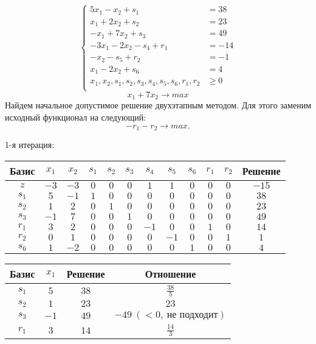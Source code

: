 \documentclass{article}%
\begin{document}
\[%
\left\{\begin{aligned}5x_{1}-x_{2}+s_{1} & =38 \\x_{1}+2x_{2}+s_{2} & =23 \\-x_{1}+7x_{2}+s_{3} & =49 \\-3x_{1}-2x_{2}-s_{4}+r_{1} & =-14 \\-x_{2}-s_{5}+r_{2} & =-1 \\x_{1}-2x_{2}+s_{6} & =4 \\x_{1},x_{2},s_{1},s_{2},s_{3},s_{4},s_{5},s_{6},r_{1},r_{2} & \ge 0 \\ \end{aligned}\right.%
\]%
\[%
x_{1}+7x_{2}  \to max%
\]%
Найдем начальное допустимое решение двухэтапным методом. Для этого заменим исходный функционал на следующий: %
\[%
-r_{1}-r_{2}\to max.%
\]%
\begin{flushleft}%
1{-}я итерация: %
\newline%
\newline%
\renewcommand{\arraystretch}{1.3}%
\begin{tabular}{|c|cccccccccc|c|}%
\hline%
Базис&$x_{1}$&$x_{2}$&$s_{1}$&$s_{2}$&$s_{3}$&$s_{4}$&$s_{5}$&$s_{6}$&$r_{1}$&$r_{2}$&Решение\\%
\hline%
$z$&$-3$&$-3$&$0$&$0$&$0$&$1$&$1$&$0$&$0$&$0$&$-15$\\%
\hline%
$s_{1}$&$5$&$-1$&$1$&$0$&$0$&$0$&$0$&$0$&$0$&$0$&$38$\\%
$s_{2}$&$1$&$2$&$0$&$1$&$0$&$0$&$0$&$0$&$0$&$0$&$23$\\%
$s_{3}$&$-1$&$7$&$0$&$0$&$1$&$0$&$0$&$0$&$0$&$0$&$49$\\%
$r_{1}$&$3$&$2$&$0$&$0$&$0$&$-1$&$0$&$0$&$1$&$0$&$14$\\%
$r_{2}$&$0$&$1$&$0$&$0$&$0$&$0$&$-1$&$0$&$0$&$1$&$1$\\%
$s_{6}$&$1$&$-2$&$0$&$0$&$0$&$0$&$0$&$1$&$0$&$0$&$4$\\%
\hline%
\end{tabular}%
\newline%
\newline%
\newline%
\begin{tabular}{|cccc|}%
\hline%
Базис&$x_{1}$&Решение&Отношение\\%
\hline%
$s_{1}$&$5$&$38$&$\frac{38}{5}$\\%
$s_{2}$&$1$&$23$&$23$\\%
$s_{3}$&$-1$&$49$&$-49\: (< 0, \: \text{не подходит})$\\%
$r_{1}$&$3$&$14$&$\frac{14}{3}$\\%

\end{tabular}
\end{flushleft}
\end{document}
